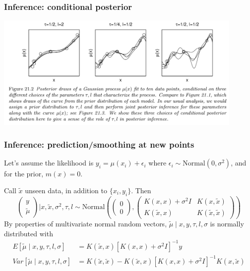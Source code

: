 \documentclass{beamer}
\begin{document}
\begin{frame}
\frametitle{Inference: conditional posterior}

\begin{center}
\includegraphics[width=120mm]{conditional_posterior.png}
\end{center}

\end{frame}
\begin{frame}
\frametitle{Inference: prediction/smoothing at new points}


Let's assume the likelihood is $y_i = \mu(x_i) + \epsilon_i$ where $\epsilon_i \sim \text{Normal}(0,\sigma^2)$, and for the prior, $m(x) = 0$. 
\newline

Call $\tilde{x}$ unseen data, in addition to $\{x_i,y_i\}$. Then
$$
\left(\begin{array}{c}
y \\
\tilde{\mu}
\end{array}\right) 
\bigg\rvert x, \tilde{x}, \sigma^2, \tau, l
\sim \text{Normal}\left(
\left(\begin{array}{c}
0\\
0
\end{array}\right),
\left(\begin{array}{cc}
K(x,x) + \sigma^2 I & K(x,\tilde{x})\\
K(\tilde{x}, x) & K(\tilde{x}, \tilde{x})
\end{array}\right)
\right)
$$
By properties of multivariate normal random vectors, $\tilde{\mu} \mid x, y, \tau, l, \sigma$ is normally distributed with
\begin{align*}
E[\tilde{\mu} \mid x, y, \tau, l, \sigma] &= K(\tilde{x}, x) [K(x,x) + \sigma^2 I]^{-1} y \\
Var[\tilde{\mu}\mid x, y, \tau, l, \sigma] &= K(\tilde{x}, \tilde{x}) - K(\tilde{x}, x)[K(x,x) + \sigma^2 I]^{-1} K(x,\tilde{x})
\end{align*}

\end{frame}
\end{document}

